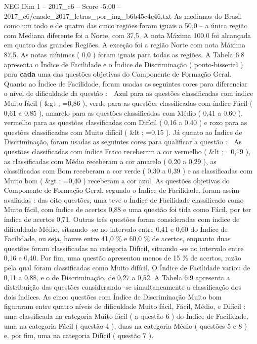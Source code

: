 \begin{textsample}{NEG Dim 1 – 2017\_c6 – Score -5.00 – 2017\_c6/enade\_2017\_letras\_por\_ing\_b6b45c4c46.txt}
As medianas do Brasil como um todo e de quatro das cinco regiões foram iguais a 50,0 – a única região com Mediana diferente foi a Norte, com 37,5.
A nota Máxima 100,0 foi alcançada em quatro das grandes Regiões.
A exceção foi a região Norte com nota Máxima 87,5.
As notas mínimas ( 0,0 ) foram iguais para todas as regiões.
A Tabela 6.8 apresenta o Índice de Facilidade e o Índice de Discriminação ( ponto-bisserial ) para \textbf{cada} uma das questões objetivas do Componente de Formação Geral.
Quanto ao Índice de Facilidade, foram usadas as seguintes cores para diferenciar o nível de dificuldade da questão :  Azul para as questões classificadas com índice Muito fácil ( \&gt ; =0,86 ), verde para as questões classificadas com índice Fácil ( 0,61 a 0,85 ), amarelo para as questões classificadas com Médio ( 0,41 a 0,60 ), vermelho para as questões classificadas com Difícil ( 0,16 a 0,40 ) e roxo para as questões classificadas com Muito difícil ( \&lt ; =0,15 ).
Já quanto ao Índice de Discriminação, foram usadas as seguintes cores para qualificar a questão :  As questões classificadas com índice Fraco receberam a cor vermelho ( \&lt ; =0,19 ), as classificadas com Médio receberam a cor amarelo ( 0,20 a 0,29 ), as classificadas com Bom receberam a cor verde ( 0,30 a 0,39 ) e as classificadas com Muito bom ( \&gt ; =0,40 ) receberam a cor azul.
As questões objetivas do Componente de Formação Geral, segundo o Índice de Facilidade, foram assim avaliadas : das oito questões, uma teve o Índice de Facilidade classificado como Muito fácil, com índice de acertos 0,88 e uma questão foi tida como Fácil, por ter índice de acertos 0,71.
Outras três questões foram consideradas com índice de dificuldade Médio, situando -se no intervalo entre 0,41 e 0,60 do Índice de Facilidade, ou seja, houve entre 41,0 \% e 60,0 \% de acertos, enquanto duas questões foram classificadas na categoria Difícil, situando -se no intervalo entre 0,16 e 0,40.
Por fim, uma questão apresentou menos de 15 \% de acertos, razão pela qual foram classificadas como Muito difícil.
O Índice de Facilidade variou de 0,11 a 0,88, e o de Discriminação, de 0,27 a 0,52.
A Tabela 6.9 apresenta a distribuição das questões considerando -se simultaneamente a classificação dos dois índices.
As cinco questões com Índice de Discriminação Muito bom figuraram entre quatro níveis de dificuldade Muito fácil, Fácil, Médio, e Difícil : uma classificada na categoria Muito fácil ( a questão 6 ) do Índice de Facilidade, uma na categoria Fácil ( questão 4 ), duas na categoria Médio ( questões 5 e 8 ) e, por fim, uma na categoria Difícil ( questão 7 ).

\end{textsample}
